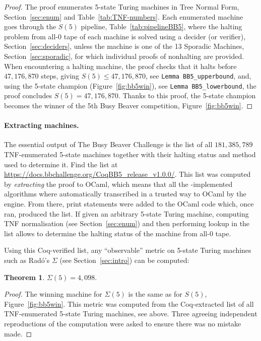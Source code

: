 \documentclass[a4paper,british]{article}
\theoremstyle{definition} %
\newtheorem{theorem}{Theorem}[section]
\numberwithin{equation}{section}
\theoremstyle{definition} %
\newcommand{\BBtheFifthTNF}{181{,}385{,}789}
\newcommand{\rado}{Rad\'o\xspace}
\newcommand{\numSporadic}{13\xspace}
\begin{document}
\thBBTheFifth*
\begin{proof}
    The \Coq proof enumerates 5-state Turing machines in Tree Normal Form, Section~\ref{sec:enum} and Table~\ref{tab:TNF-numbers}. Each enumerated machine goes through the $S(5)$ pipeline, Table~\ref{tab:pipelineBB5}, where the halting problem from all-0 tape of each machine is solved using a decider (or verifier), Section~\ref{sec:deciders}, unless the machine is one of the \numSporadic Sporadic Machines, Section~\ref{sec:sporadic}, for which individual \Coq proofs of nonhalting are provided.
    When encountering a halting machine, the proof checks that it halts before $47{,}176{,}870$ steps, giving $S(5) \leq 47{,}176{,}870$, see \texttt{Lemma BB5\_upperbound}, and, using the 5-state champion (Figure~\ref{fig:bb5win}), see \texttt{Lemma BB5\_lowerbound}, the proof concludes $S(5) = 47{,}176{,}870$. Thanks to this proof, the 5-state champion becomes the winner of the 5th Busy Beaver competition, Figure~\ref{fig:bb5win}.
\end{proof}

\paragraph{Extracting machines.} The essential output of The Busy Beaver Challenge is the list of all $\BBtheFifthTNF$ TNF-enumerated 5-state machines together with their halting status and method used to determine it. Find the list at \url{https://docs.bbchallenge.org/CoqBB5_release_v1.0.0/}. This list was computed by \textit{extracting} the \Coq proof to OCaml, which means that all the \Coq-implemented algorithms where automatically transcribed  in a trusted way to OCaml by the \Coq engine. From there, print statements were added to the OCaml code which, once ran, produced the list. If given an arbitrary 5-state Turing machine, computing TNF normalisation (see Section~\ref{sec:enum}) and then performing lookup in the list allows to determine the halting status of the machine from all-0 tape.

Using this Coq-verified list, any ``observable'' metric on 5-state Turing machines such as \rado's $\Sigma$ (see Section~\ref{sec:intro}) can be computed:

\begin{theorem}\label{th:Sigma5}
    $\Sigma(5) = 4{,}098$.
\end{theorem}
\begin{proof}
    The winning machine for $\Sigma(5)$ is the same as for $S(5)$, Figure~\ref{fig:bb5win}.
    This metric was computed from the Coq-extracted list of all TNF-enumerated 5-state Turing machines, see above. Three agreeing independent reproductions of the computation were asked to ensure there was no mistake made.
\end{proof}
\end{document}
